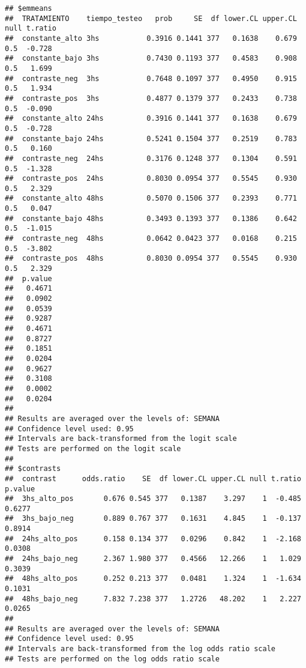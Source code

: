 \documentclass[
]{article}
\begin{document}
\begin{verbatim}
## $emmeans
##  TRATAMIENTO    tiempo_testeo   prob     SE  df lower.CL upper.CL null t.ratio
##  constante_alto 3hs           0.3916 0.1441 377   0.1638    0.679  0.5  -0.728
##  constante_bajo 3hs           0.7430 0.1193 377   0.4583    0.908  0.5   1.699
##  contraste_neg  3hs           0.7648 0.1097 377   0.4950    0.915  0.5   1.934
##  contraste_pos  3hs           0.4877 0.1379 377   0.2433    0.738  0.5  -0.090
##  constante_alto 24hs          0.3916 0.1441 377   0.1638    0.679  0.5  -0.728
##  constante_bajo 24hs          0.5241 0.1504 377   0.2519    0.783  0.5   0.160
##  contraste_neg  24hs          0.3176 0.1248 377   0.1304    0.591  0.5  -1.328
##  contraste_pos  24hs          0.8030 0.0954 377   0.5545    0.930  0.5   2.329
##  constante_alto 48hs          0.5070 0.1506 377   0.2393    0.771  0.5   0.047
##  constante_bajo 48hs          0.3493 0.1393 377   0.1386    0.642  0.5  -1.015
##  contraste_neg  48hs          0.0642 0.0423 377   0.0168    0.215  0.5  -3.802
##  contraste_pos  48hs          0.8030 0.0954 377   0.5545    0.930  0.5   2.329
##  p.value
##   0.4671
##   0.0902
##   0.0539
##   0.9287
##   0.4671
##   0.8727
##   0.1851
##   0.0204
##   0.9627
##   0.3108
##   0.0002
##   0.0204
## 
## Results are averaged over the levels of: SEMANA 
## Confidence level used: 0.95 
## Intervals are back-transformed from the logit scale 
## Tests are performed on the logit scale 
## 
## $contrasts
##  contrast      odds.ratio    SE  df lower.CL upper.CL null t.ratio p.value
##  3hs_alto_pos       0.676 0.545 377   0.1387    3.297    1  -0.485  0.6277
##  3hs_bajo_neg       0.889 0.767 377   0.1631    4.845    1  -0.137  0.8914
##  24hs_alto_pos      0.158 0.134 377   0.0296    0.842    1  -2.168  0.0308
##  24hs_bajo_neg      2.367 1.980 377   0.4566   12.266    1   1.029  0.3039
##  48hs_alto_pos      0.252 0.213 377   0.0481    1.324    1  -1.634  0.1031
##  48hs_bajo_neg      7.832 7.238 377   1.2726   48.202    1   2.227  0.0265
## 
## Results are averaged over the levels of: SEMANA 
## Confidence level used: 0.95 
## Intervals are back-transformed from the log odds ratio scale 
## Tests are performed on the log odds ratio scale
\end{verbatim}
\end{document}
